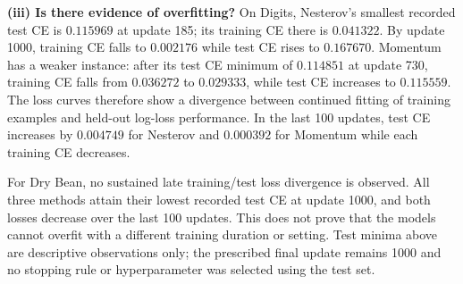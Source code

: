 \textbf{(iii) Is there evidence of overfitting?} On Digits, Nesterov's smallest recorded test CE is $0.115969$ at update 185; its training CE there is $0.041322$. By update 1000, training CE falls to $0.002176$ while test CE rises to $0.167670$. Momentum has a weaker instance: after its test CE minimum of $0.114851$ at update 730, training CE falls from $0.036272$ to $0.029333$, while test CE increases to $0.115559$. The loss curves therefore show a divergence between continued fitting of training examples and held-out log-loss performance. In the last 100 updates, test CE increases by $0.004749$ for Nesterov and $0.000392$ for Momentum while each training CE decreases.

For Dry Bean, no sustained late training/test loss divergence is observed. All three methods attain their lowest recorded test CE at update 1000, and both losses decrease over the last 100 updates. This does not prove that the models cannot overfit with a different training duration or setting. Test minima above are descriptive observations only; the prescribed final update remains 1000 and no stopping rule or hyperparameter was selected using the test set.
